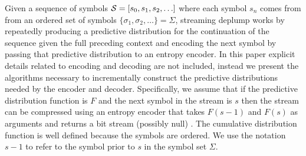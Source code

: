 Given a sequence of symbols $\Seq = [s_0, s_1, s_2, \ldots]$ where each symbol $s_n$ comes from from an ordered set of symbols $\{\sigma_1, \sigma_2, \ldots\} = \Sigma$,  streaming deplump works by repeatedly producing a predictive distribution for the continuation of the sequence given the full preceding context and encoding the next symbol by passing that predictive distribution to an entropy encoder.  In this paper explicit details related to encoding and decoding are not included, instead we present the algorithms necessary to incrementally construct the predictive distributions needed by the encoder and decoder.  Specifically, we assume that if the predictive distribution function is $F$ and the next symbol in the stream is $s$ then the stream can be compressed using an entropy encoder that takes $F(s-1)$ and $F(s)$ as arguments and returns a bit stream (possibly null) \citep{Witten1987}.   The cumulative distribution function is well defined because the symbols are ordered. We use the notation $s-1$ to refer to the symbol prior to $s$ in the symbol set $\Sigma$.  %
